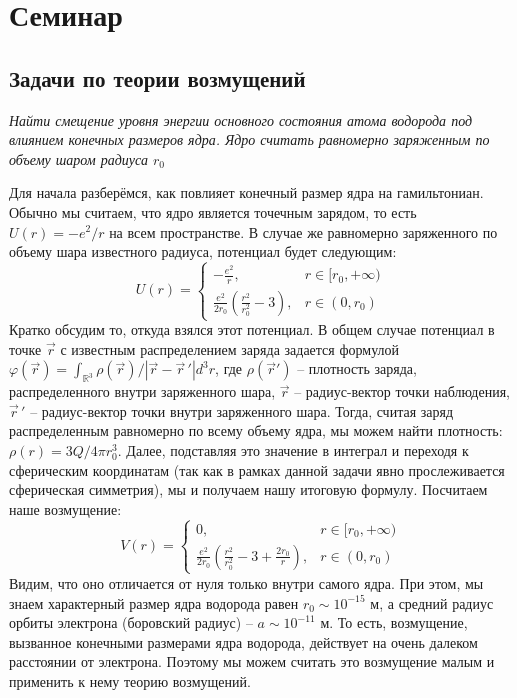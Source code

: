 \section{Семинар \thesection}
\subsection{Задачи по теории возмущений}
\begin{exercise}
  \textit{Найти смещение уровня энергии основного состояния атома водорода под
    влиянием конечных размеров ядра. Ядро считать равномерно заряженным по объему
    шаром радиуса $r_0$}
\end{exercise}

Для начала разберёмся, как повлияет конечный размер ядра на гамильтониан.
Обычно мы считаем, что ядро является точечным зарядом, то есть $U(r) = -e^2/r$
на всем пространстве. В случае же равномерно заряженного по объему шара
известного радиуса, потенциал будет следующим:
\[
  U(r)=\begin{cases}
    -\frac{e^2}{r}, &r\in [r_0, +\infty) \\
    \frac{e^2}{2r_0}\left(\frac{r^2}{r_0^2}-3\right), &r\in(0, r_0)
  \end{cases}
\]
Кратко обсудим то, откуда взялся этот потенциал. В общем случае потенциал в
точке $\Vec{r}$ с известным распределением заряда задается формулой
$\varphi(\Vec{r}) = \int_{\mathbb{R}^3}\rho(\Vec{r})/|\Vec{r}-\Vec{r}\,'|d^3r$,
где $\rho(\Vec{r}')$ -- плотность заряда, распределенного внутри заряженного
шара, $\Vec{r}$ -- радиус-вектор точки наблюдения, $\Vec{r}\,'$ --
радиус-вектор точки внутри заряженного шара. Тогда, считая заряд распределенным
равномерно по всему объему ядра, мы можем найти плотность: $\rho(r)=3Q/4\pi
  r_0^3$. Далее, подставляя это значение в интеграл и переходя к сферическим
координатам (так как в рамках данной задачи явно прослеживается сферическая
симметрия), мы и получаем нашу итоговую формулу. Посчитаем наше возмущение:
\[
  V(r) = \begin{cases}
    0, & r\in[r_0, +\infty) \\
    \frac{e^2}{2r_0}\left(\frac{r^2}{r_0^2}-3+\frac{2r_0}{r}\right), & r\in(0, r_0)
  \end{cases}
\]
Видим, что оно отличается от нуля только внутри самого ядра. При этом, мы знаем
характерный размер ядра водорода равен $r_0\sim 10^{-15}$ м, а средний радиус
орбиты электрона (боровский радиус) -- $a\sim 10^{-11}$ м. То есть, возмущение,
вызванное конечными размерами ядра водорода, действует на очень далеком
расстоянии от электрона. Поэтому мы можем считать это возмущение малым и
применить к нему теорию возмущений.

